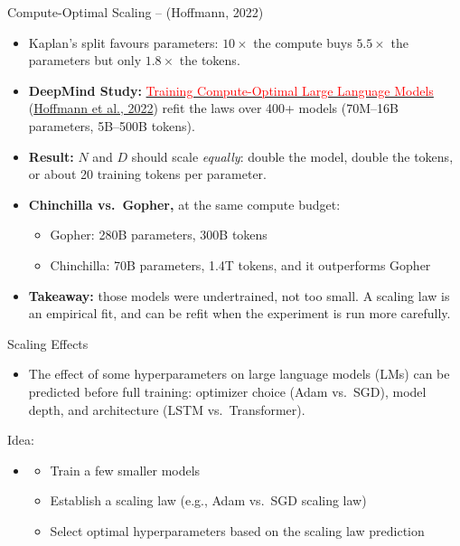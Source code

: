 \begin{frame}{Compute-Optimal Scaling -- \textnormal{(Hoffmann, 2022)}}
  \begin{itemize}\itemsep0.25em
    \item Kaplan's split favours parameters: $10\times$ the compute buys $5.5\times$ the parameters but only $1.8\times$ the tokens.
    \item \textbf{DeepMind Study:} \href{https://arxiv.org/abs/2203.15556}{\textcolor{red}{Training Compute-Optimal Large Language Models}} (\href{https://arxiv.org/abs/2203.15556}{Hoffmann et al., 2022}) refit the laws over 400+ models (70M--16B parameters, 5B--500B tokens).
    \item \textbf{Result:} $N$ and $D$ should scale \emph{equally}: double the model, double the tokens, or about 20 training tokens per parameter.
    \item \textbf{Chinchilla vs.\ Gopher,} at the same compute budget:
      \begin{itemize}
        \item Gopher: 280B parameters, 300B tokens
        \item Chinchilla: 70B parameters, 1.4T tokens, and it outperforms Gopher
      \end{itemize}
    \item \textbf{Takeaway:} those models were undertrained, not too small. A scaling law is an empirical fit, and can be refit when the experiment is run more carefully.
  \end{itemize}
\end{frame}

\begin{frame}{Scaling Effects}
  \begin{itemize}
    \item The effect of some hyperparameters on large language models (LMs) can be predicted before full training: optimizer choice (Adam vs.\ SGD), model depth, and architecture (LSTM vs.\ Transformer).
  \end{itemize}
  \vspace{0.9em}
  Idea:
  \begin{itemize}
    \item[] \begin{itemize}
      \item Train a few smaller models
      \item Establish a scaling law (e.g., Adam vs.\ SGD scaling law)
      \item Select optimal hyperparameters based on the scaling law prediction
    \end{itemize}
  \end{itemize}
\end{frame}

